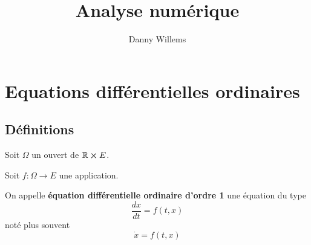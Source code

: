 \documentclass[a4paper, 11pt]{report}
\title{Analyse numérique}
\author{Danny Willems}
\begin{document}
\maketitle

\tableofcontents

\chapter{Equations différentielles ordinaires}

\section{Définitions}
	\begin{definition} 
		Soit $\Omega$ un ouvert de $\mathbb{R} \cross E$.

		Soit $f : \Omega \rightarrow E$ une application.

		On appelle \textbf{équation différentielle ordinaire d'ordre 1} une équation
		du type
		\begin{equation}
			\frac{dx}{dt} = f(t, x)
		\end{equation}
		noté plus souvent
		\begin{equation}
			\dot{x} = f(t, x)
		\end{equation}
	\end{definition}



\end{document}
